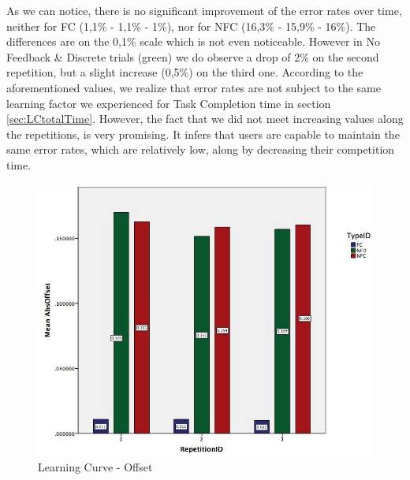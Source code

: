As we can notice, there is no significant improvement of the error rates over time, neither for FC (1,1\% - 1,1\% - 1\%), nor for NFC (16,3\% - 15,9\% - 16\%). The differences are on the 0,1\% scale which is not even noticeable. However in No Feedback \& Discrete trials (green) we do observe a drop of 2\% on the second repetition, but a slight increase (0,5\%) on the third one.
According to the aforementioned values, we realize that error rates are not subject to the same learning factor we experienced for Task Completion time in section \ref{sec:LCtotalTime}. However, the fact that we did not meet increasing values along the repetitions, is very promising. It infers that users are capable to maintain the same error rates, which are relatively low, along by decreasing their competition time.






\begin{figure}[H]
\centering
\includegraphics[width=\textwidth]{figures/learningCurveOffset}
\caption{Learning Curve - Offset}
\label{fig:learningCurveOffset}
\end{figure}


